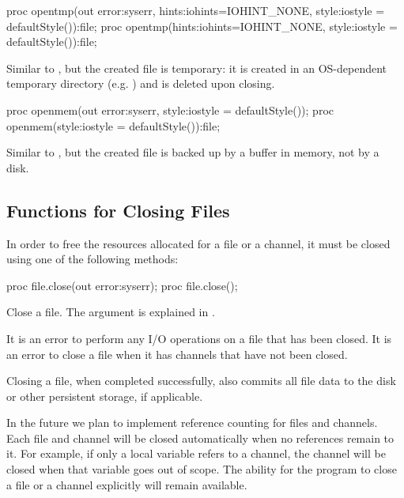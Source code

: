 \begin{protohead}
proc opentmp(out error:syserr, hints:iohints=IOHINT_NONE, style:iostyle = defaultStyle()):file;
proc opentmp(hints:iohints=IOHINT_NONE, style:iostyle = defaultStyle()):file;
\end{protohead}
\begin{protobody}
Similar to , but the created file is temporary:
it is created in an OS-dependent temporary directory (e.g. )
and is deleted upon closing.
\end{protobody}

\begin{protohead}
proc openmem(out error:syserr, style:iostyle = defaultStyle());
proc openmem(style:iostyle = defaultStyle()):file;
\end{protohead}
\begin{protobody}
Similar to , but
the created file is backed up by a buffer in memory, not by a disk.
\end{protobody}


\subsection{Functions for Closing Files}
\label{IO_closing_files}

In order to free the resources allocated for a file or a channel, it
must be closed using one of the following methods:

\begin{protohead}
proc file.close(out error:syserr);
proc file.close();
\end{protohead}
\begin{protobody}
Close a file.
The  argument is explained in .
\end{protobody}

It is an error to perform any I/O operations on a file
that has been closed.
It is an error to close a file when it has channels that
have not been closed.

Closing a file, when completed successfully, also commits
all file data to the disk or other persistent storage,
if applicable.

\begin{future}
In the future we plan to implement reference counting for files
and channels. Each file and channel will be closed automatically
when no references remain to it. For example, if only a local
variable refers to a channel, the channel will be closed
when that variable goes out of scope.
The ability for the program to close a file or a channel
explicitly will remain available.
\end{future}



